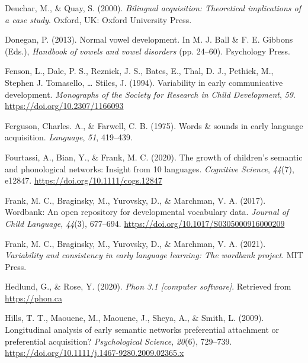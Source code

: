 \documentclass[
  man,mask,floatsintext]{apa6}
\newlength{\cslhangindent}
\newlength{\cslentryspacingunit} %
\newenvironment{CSLReferences}[2] %
 {%
  \setlength{\parindent}{0pt}
  \ifodd #1
  \let\oldpar\par
  \def\par{\hangindent=\cslhangindent\oldpar}
  \fi
  \setlength{\parskip}{#2\cslentryspacingunit}
 }%
 {}
\begin{document}
\begin{CSLReferences}{1}{0}
\leavevmode{}%
Deuchar, M., \& Quay, S. (2000). \emph{Bilingual acquisition: Theoretical implications of a case study}. Oxford, {UK}: Oxford University Press.

\leavevmode{}%
Donegan, P. (2013). Normal vowel development. In M. J. Ball \& F. E. Gibbons (Eds.), \emph{Handbook of vowels and vowel disorders} (pp. 24--60). Psychology Press.

\leavevmode{}%
Fenson, L., Dale, P. S., Reznick, J. S., Bates, E., Thal, D. J., Pethick, M., Stephen J. Tomasello, \ldots{} Stiles, J. (1994). Variability in early communicative development. \emph{Monographs of the Society for Research in Child Development}, \emph{59}. \url{https://doi.org/10.2307/1166093}

\leavevmode{}%
Ferguson, Charles. A., \& Farwell, C. B. (1975). Words \& sounds in early language acquisition. \emph{Language}, \emph{51}, 419--439.

\leavevmode{}%
Fourtassi, A., Bian, Y., \& Frank, M. C. (2020). The growth of children's semantic and phonological networks: Insight from 10 languages. \emph{Cognitive Science}, \emph{44}(7), e12847. \url{https://doi.org/10.1111/cogs.12847}

\leavevmode{}%
Frank, M. C., Braginsky, M., Yurovsky, D., \& Marchman, V. A. (2017). Wordbank: An open repository for developmental vocabulary data. \emph{Journal of Child Language}, \emph{44}(3), 677--694. \url{https://doi.org/10.1017/S0305000916000209}

\leavevmode{}%
Frank, M. C., Braginsky, M., Yurovsky, D., \& Marchman, V. A. (2021). \emph{Variability and consistency in early language learning: The wordbank project}. {MIT} Press.

\leavevmode{}%
Hedlund, G., \& Rose, Y. (2020). \emph{Phon 3.1 {[}computer software{]}}. Retrieved from \url{https://phon.ca}

\leavevmode{}%
Hills, T. T., Maouene, M., Maouene, J., Sheya, A., \& Smith, L. (2009). Longitudinal analysis of early semantic networks preferential attachment or preferential acquisition? \emph{Psychological Science}, \emph{20}(6), 729--739. \url{https://doi.org/10.1111/j.1467-9280.2009.02365.x}


\end{CSLReferences}
\end{document}
